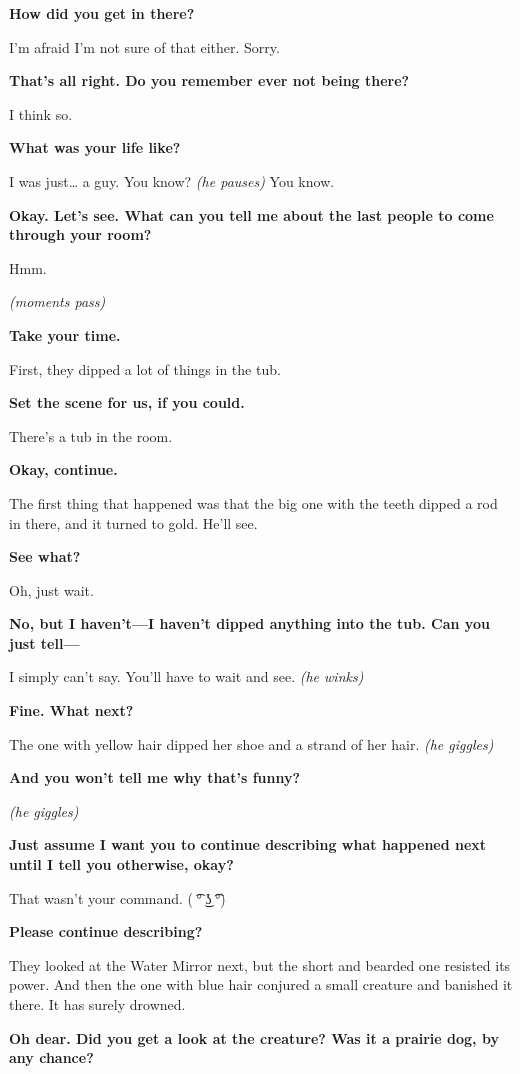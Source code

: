 \documentclass[smalldemyvopaper,11pt,twoside,onecolumn,openright,extrafontsizes]{memoir}
\begin{document}
\textbf{How did you get in there?}

I'm afraid I'm not sure of that either. Sorry.

\textbf{That's all right. Do you remember ever not being there?}

I think so.

\textbf{What was your life like?}

I was just\ldots{} a guy. You know? \emph{(he pauses)} You know.

\textbf{Okay. Let's see. What can you tell me about the last people to
come through your room?}

Hmm.

\emph{(moments pass)}

\textbf{Take your time.}

First, they dipped a lot of things in the tub.

\textbf{Set the scene for us, if you could.}

There's a tub in the room.

\textbf{Okay, continue.}

The first thing that happened was that the big one with the teeth dipped
a rod in there, and it turned to gold. He'll see.

\textbf{See what?}

Oh, just wait.

\textbf{No, but I haven't---I haven't dipped anything into the tub. Can
you just tell---}

I simply can't say. You'll have to wait and see. \emph{(he winks)}

\textbf{Fine. What next?}

The one with yellow hair dipped her shoe and a strand of her hair.
\emph{(he giggles)}

\textbf{And you won't tell me why that's funny?}

\emph{(he giggles)}

\textbf{Just assume I want you to continue describing what happened next
until I tell you otherwise, okay?}

That wasn't your command. ( ͡° ͜ʖ ͡°)

\textbf{Please continue describing?}

They looked at the Water Mirror next, but the short and bearded one
resisted its power. And then the one with blue hair conjured a small
creature and banished it there. It has surely drowned.

\textbf{Oh dear. Did you get a look at the creature? Was it a prairie
dog, by any chance?}
\end{document}
